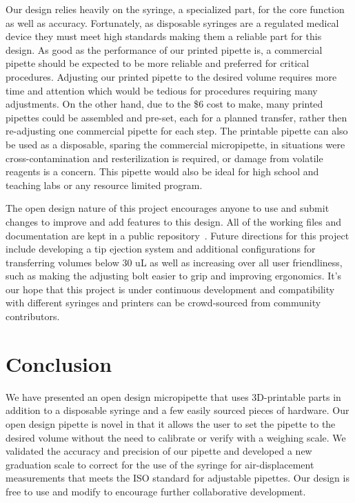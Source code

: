 \documentclass[10pt,letterpaper]{article}
\begin{document}
Our design relies heavily on the syringe, a specialized part, for the core function as well as accuracy.
Fortunately, as disposable syringes are a regulated medical device they must meet high standards making them a reliable part for this design.
As good as the performance of our printed pipette is, a commercial pipette should be expected to be more reliable and preferred for critical procedures. 
Adjusting our printed pipette to the desired volume requires more time and attention which would be tedious for procedures requiring many adjustments.
On the other hand, due to the \$6 cost to make, many printed pipettes could be assembled and pre-set, each for a planned transfer, rather then re-adjusting one commercial pipette for each step.
The printable pipette can also be used as a disposable, sparing the commercial micropipette, in situations were cross-contamination and resterilization is required, or damage from volatile reagents is a concern.
This pipette would also be ideal for high school and teaching labs or any resource limited program.

The open design nature of this project encourages anyone to use and submit changes to improve and add features to this design.
All of the working files and documentation are kept in a public repository~\cite{BMLmicropipette}.
Future directions for this project include developing a tip ejection system and additional configurations for transferring volumes below 30 uL as well as increasing over all user friendliness, such as making the adjusting bolt easier to grip and improving ergonomics.
It's our hope that this project is under continuous development and compatibility with different syringes and printers can be crowd-sourced from community contributors.

\section*{Conclusion}
We have presented an open design micropipette that uses 3D-printable parts in addition to a disposable syringe and a few easily sourced pieces of hardware.
Our open design pipette is novel in that it allows the user to set the pipette to the desired volume without the need to calibrate or verify with a weighing scale. 
We validated the accuracy and precision of our pipette and developed a new graduation scale to correct for the use of the syringe for air-displacement measurements that meets the ISO standard for adjustable pipettes.
Our design is free to use and modify to encourage further collaborative development.
\end{document}
